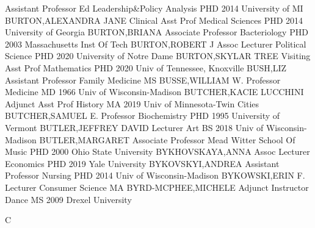 \documentclass[
]{article}
\begin{document}
\textbar Assistant Professor \textbar Ed Leadership\&Policy Analysis
\textbar{}  \textbar PHD 2014 University of MI
\textbar BURTON,ALEXANDRA JANE \textbar Clinical Asst Prof
\textbar Medical Sciences \textbar{}  \textbar PHD 2014
University of Georgia \textbar BURTON,BRIANA \textbar Associate
Professor \textbar Bacteriology \textbar{}  \textbar PHD 2003
Massachusetts Inst Of Tech \textbar BURTON,ROBERT J \textbar Assoc
Lecturer \textbar Political Science \textbar{}  \textbar PHD
2020 University of Notre Dame \textbar BURTON,SKYLAR TREE
\textbar Visiting Asst Prof \textbar Mathematics \textbar{} 
\textbar PHD 2020 Univ of Tennessee, Knoxville \textbar BUSH,LIZ
\textbar Assistant Professor \textbar Family Medicine \textbar{}
 \textbar MS \textbar BUSSE,WILLIAM W. \textbar Professor
\textbar Medicine \textbar{}  \textbar MD 1966 Univ of
Wisconsin-Madison \textbar BUTCHER,KACIE LUCCHINI \textbar Adjunct Asst
Prof \textbar History \textbar{}  \textbar MA 2019 Univ of
Minnesota-Twin Cities \textbar BUTCHER,SAMUEL E. \textbar Professor
\textbar Biochemistry \textbar{}  \textbar PHD 1995
University of Vermont \textbar BUTLER,JEFFREY DAVID \textbar Lecturer
\textbar Art \textbar{}  \textbar BS 2018 Univ of
Wisconsin-Madison \textbar BUTLER,MARGARET \textbar Associate Professor
\textbar Mead Witter School Of Music \textbar{}  \textbar PHD
2000 Ohio State University \textbar BYKHOVSKAYA,ANNA \textbar Assoc
Lecturer \textbar Economics \textbar{}  \textbar PHD 2019
Yale University \textbar BYKOVSKYI,ANDREA \textbar Assistant Professor
\textbar Nursing \textbar{}  \textbar PHD 2014 Univ of
Wisconsin-Madison \textbar BYKOWSKI,ERIN F. \textbar Lecturer
\textbar Consumer Science \textbar{}  \textbar MA
\textbar BYRD-MCPHEE,MICHELE \textbar Adjunct Instructor \textbar Dance
\textbar{}  \textbar MS 2009 Drexel University \textbar{}

C

\textbar{}
\end{document}
